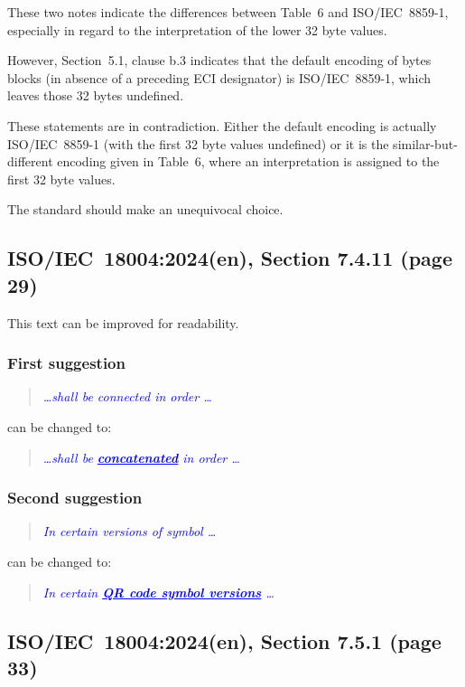 \documentclass[a4paper,twoside]{article}
\newcommand{\shortstandard}{ISO/IEC~18004}
\newcommand{\standard}{\shortstandard:2024(en)}
\newcommand{\quotestandard}[1]{\textcolor{blue}{\textit{#1}}}
\newcommand{\ddd}{\dots}
\newcommand{\change}[1]{\underline{\textbf{#1}}}
\begin{document}
These two notes indicate the differences between Table~6 and ISO/IEC~8859-1, especially in
regard to the interpretation of  the lower 32 byte values.

However, Section~5.1, clause b.3 indicates that the default encoding of bytes blocks
(in absence of a preceding ECI designator) is ISO/IEC~8859-1, which leaves those 32 bytes
undefined.

These statements are in contradiction. Either the default encoding is actually ISO/IEC~8859-1
(with the first 32 byte values undefined) or it is the similar-but-different encoding given
in Table~6, where an interpretation is assigned to the first 32 byte values.

The standard should make an unequivocal choice.

\subsection{\standard, Section 7.4.11 (page 29)}

This text can be improved for readability.

\subsubsection*{First suggestion}

\begin{quote}
\quotestandard{\ddd shall be connected in order \ddd}
\end{quote}

can be changed to:

\begin{quote}
\quotestandard{\ddd shall be \change{concatenated} in order \ddd}
\end{quote}

\subsubsection*{Second suggestion}

\begin{quote}
\quotestandard{In certain versions of symbol \ddd}
\end{quote}

can be changed to:

\begin{quote}
\quotestandard{In certain \change{QR code symbol versions} \ddd}
\end{quote}

\subsection{\standard, Section 7.5.1 (page 33)}
\end{document}
